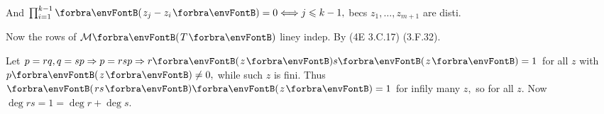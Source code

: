\hfill And $\prod_{i=1}^{k-1}\Par{z_j-z_i}=0 \Longleftrightarrow j\leqslant k-1,$ becs $z_1,\dots,z_{m+1}$ are disti.\Blind{\quad\qquad}\vspace{30pt}\par\quad
\hfill Now the rows of $\Mt{T}$ liney indep. By (4E 3.C.17) \OR (3.F.32).\Blind{\quad}\PfEnd\vspace{3pt}
\SepLine


%

Let $p=rq,q=sp\Rightarrow p=rsp\Rightarrow r\Par{z}s\Par{z}=1$ for all $z$ with $p\Par{z}\neq 0,$ while such $z$ is fini.\parSol{}
Thus $\Par{rs}\Par{z}=1$ for infily many $z,$ so for all $z.$ Now $\deg rs=1=\deg r+\deg s.$\PfEnd
\SepLine

